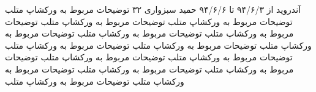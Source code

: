 {آندروید}
{از
 ۹۴/۶/۳
 تا
۹۴/۶/۶}
{حمید سبزواری}
{۳۲}
توضیحات مربوط به ورکشاپ متلب توضیحات مربوط به ورکشاپ متلب توضیحات مربوط به ورکشاپ متلب توضیحات مربوط به ورکشاپ متلب توضیحات مربوط به ورکشاپ متلب توضیحات مربوط به ورکشاپ متلب توضیحات مربوط به ورکشاپ متلب توضیحات مربوط به ورکشاپ متلب توضیحات مربوط به ورکشاپ متلب توضیحات مربوط به ورکشاپ متلب توضیحات مربوط به ورکشاپ متلب توضیحات مربوط به ورکشاپ متلب توضیحات مربوط به ورکشاپ متلب توضیحات مربوط به ورکشاپ متلب


